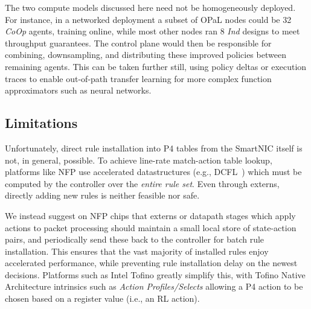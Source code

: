\documentclass[sigconf,natbib=false]{acmart}
\newcommand{\approachshort}{OPaL}
\newcommand{\Coopfw}{CoOp}
\newcommand{\coopfw}{\Coopfw}
\newcommand{\Indfw}{Ind}
\newcommand{\indfw}{\Indfw}
\begin{document}
The two compute models discussed here need not be homogeneously deployed.
For instance, in a networked deployment a subset of \approachshort{} nodes could be \SI{32}{\bit} \emph{\coopfw{}} agents, training online, while most other nodes ran \SI{8}{\bit} \emph{\indfw{}} designs to meet throughput guarantees.
The control plane would then be responsible for combining, downsampling, and distributing these improved policies between remaining agents.
This can be taken further still, using policy deltas or execution traces to enable out-of-path transfer learning for more complex function approximators such as neural networks.

%
%
%

\subsection{Limitations}
Unfortunately, direct rule installation into P4 tables from the SmartNIC itself is not, in general, possible.
To achieve line-rate match-action table lookup, platforms like NFP use accelerated datastructures (e.g., DCFL~\parencite{DBLP:conf/infocom/TaylorT05}) which must be computed by the controller over the \emph{entire rule set}.
Even through externs, directly adding new rules is neither feasible nor safe.

We instead suggest on NFP chips that externs or datapath stages which apply actions to packet processing should maintain a small local store of state-action pairs, and periodically send these back to the controller for batch rule installation.
This ensures that the vast majority of installed rules enjoy accelerated performance, while preventing rule installation delay on the newest decisions.
Platforms such as Intel Tofino greatly simplify this, with Tofino Native Architecture intrinsics such as \emph{Action Profiles/Selects} allowing a P4 action to be chosen based on a register value (i.e., an RL action).
\end{document}
